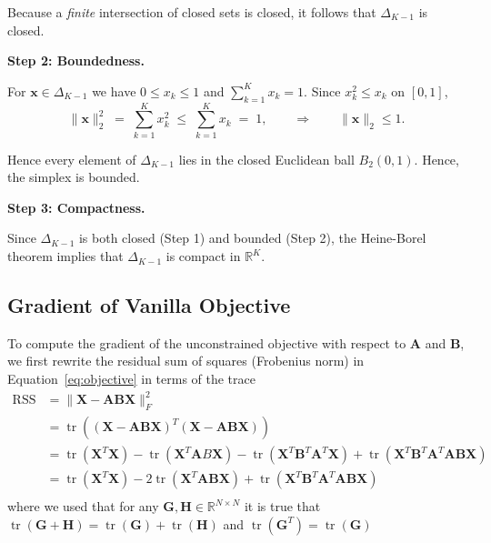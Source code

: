 \documentclass[oneside]{article}
\begin{document}
Because a \emph{finite} intersection of closed sets is closed, it follows that $\Delta_{K-1}$ is closed.

\textbf{Step 2: Boundedness.}

For $\mathbf{x} \in \Delta_{K-1}$ we have $0\le x_k\le 1$ and $\sum_{k=1}^{K}x_k = 1$. Since $x_k^2\le x_k$ on $[0,1]$,
\begin{equation}
    \|\mathbf x\|_2^2
    \;=\;
    \sum_{k=1}^{K}x_k^2
    \;\le\;
    \sum_{k=1}^{K}x_k
    \;=\;
    1,
    \qquad\Longrightarrow\qquad
    \|\mathbf x\|_2\le 1.
\end{equation}

Hence every element of $\Delta_{K-1}$ lies in the closed Euclidean ball $B_2(0,1)$. Hence, the simplex is bounded.

\textbf{Step 3: Compactness.}

Since $\Delta_{K-1}$ is both closed (Step 1) and bounded (Step 2), the Heine-Borel theorem implies that $\Delta_{K-1}$ is compact in $\mathbb R^{K}$.

\subsection{Gradient of Vanilla Objective}
\label{subsec:gradient_vanilla_obj}

To compute the gradient of the unconstrained objective with respect to $\mathbf{A}$ and $\mathbf{B}$, we first rewrite the residual sum of squares (Frobenius norm) in Equation~\eqref{eq:objective} in terms of the trace\begin{equation}
    \begin{aligned}
        \operatorname{RSS} &= \| \mathbf{X} - \mathbf{A} \mathbf{B} \mathbf{X}\|_F^2 \\
        &= \operatorname{tr} \left( \left( \mathbf{X} - \mathbf{A} \mathbf{B} \mathbf{X} \right)^T \left( \mathbf{X} - \mathbf{A} \mathbf{B} \mathbf{X} \right) \right) \\
        &=  \operatorname{tr}(\mathbf{X}^T \mathbf{X}) - \operatorname{tr}(\mathbf{X}^T \mathbf{A} B \mathbf{X}) - \operatorname{tr}(\mathbf{X}^T \mathbf{B}^T \mathbf{A}^T \mathbf{X}) + \operatorname{tr}(\mathbf{X}^T \mathbf{B}^T \mathbf{A}^T \mathbf{A} \mathbf{B} \mathbf{X}) \\
        &=  \operatorname{tr}(\mathbf{X}^T \mathbf{X}) - 2 \operatorname{tr}(\mathbf{X}^T \mathbf{A} \mathbf{B} \mathbf{X}) + \operatorname{tr}(\mathbf{X}^T \mathbf{B}^T \mathbf{A}^T \mathbf{A} \mathbf{B} \mathbf{X}) \\
    \end{aligned}
\end{equation}
where we used that for any $\mathbf{G}, \mathbf{H} \in \mathbb{R}^{N \times N}$ it is true that $\operatorname{tr}(\mathbf{G} + \mathbf{H}) = \operatorname{tr}(\mathbf{G})+\operatorname{tr}(\mathbf{H})$ and $\operatorname{tr}(\mathbf{G}^T)=\operatorname{tr}(\mathbf{G})$
\end{document}
